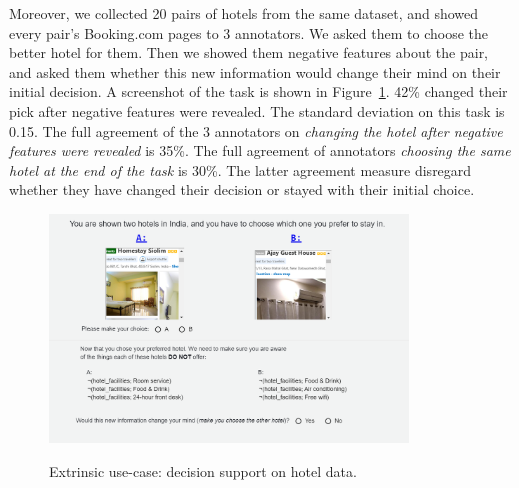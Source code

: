 \begin{table}
\caption{Negative statements for hotels in India.}
\centering
{}
\label{tab:hotels}
\end{table}

Moreover, we collected 20 pairs of hotels from the same dataset, and showed every pair's Booking.com pages to 3 annotators. We asked them to choose the better hotel for them. Then we showed them negative features about the pair, and asked them whether this new information would change their mind on their initial decision. A screenshot of the task is shown in Figure~\ref{fig:hotel}. 42\% changed their pick after negative features were revealed. The standard deviation on this task is 0.15. The full agreement of the 3 annotators on \textit{changing the hotel after negative features were revealed} is 35\%. The full agreement of annotators \textit{choosing the same hotel at the end of the task} is 30\%. The latter agreement measure disregard whether they have changed their decision or stayed with their initial choice.

\begin{figure}
 \caption{Extrinsic use-case: decision support on hotel data.}
 \centering
\includegraphics[width=0.85\textwidth]{figures/hotel.png}
\label{fig:hotel}
\end{figure}

